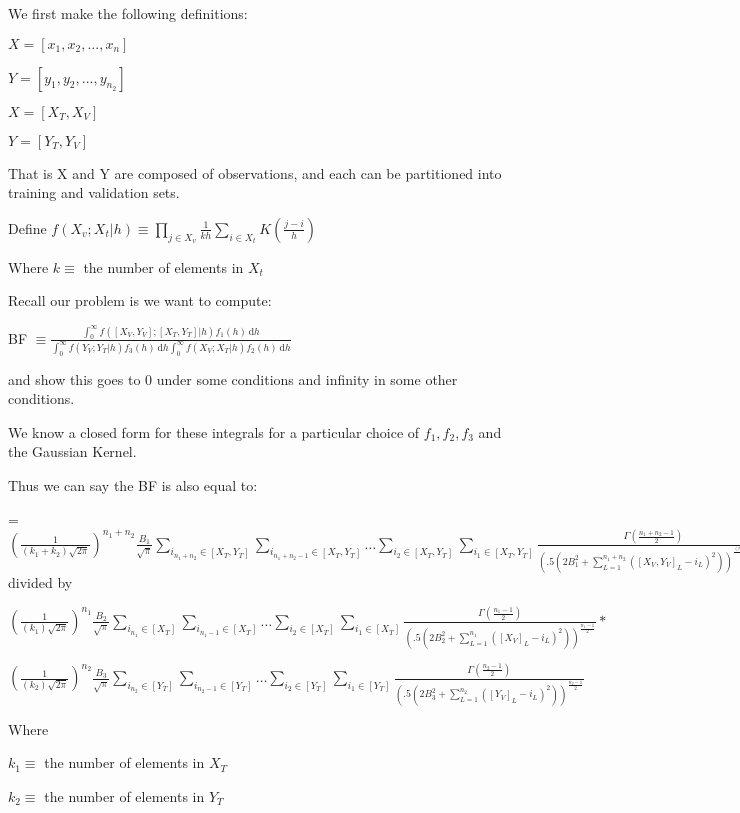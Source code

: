 \documentclass[11pt]{article}
\begin{document}
We first make the following definitions:

$X = [x_1,x_2,...,x_n]$

$Y = [y_1,y_2,...,y_{n_2}]$

$X = [X_T,X_V]$

$Y = [Y_T,Y_V]$

That is X and Y are composed of observations, and each can be partitioned into training and validation sets.

Define $f(X_v; X_t |h) \equiv \prod_{j \in X_v} \frac{1}{kh} \sum_{i \in X_t} K(\frac{j-i}{h})$

Where $k \equiv $ the number of elements in $X_t$

Recall our problem is we want to compute:

BF  $\equiv \frac{\int_0^\infty \! f([X_V,Y_V];[ X_T,Y_T] |h) f_1(h)\, \mathrm{d}h}{\int_0^\infty \! f(Y_V; Y_T|h) f_3(h)\, \mathrm{d}h \int_0^\infty \! f(X_V; X_T|h) f_2(h)\, \mathrm{d}h}$

and show this goes to 0 under some conditions and infinity in some other conditions.

We know a closed form for these integrals for a particular choice of $f_1, f_2, f_3$ and the Gaussian Kernel.

Thus we can say the BF is also equal to:

= $(\frac{1}{(k_1 + k_2)\sqrt{2\pi}})^{n_1+n_2} \frac{B_1}{\sqrt{\pi}}  \sum_{i_{n_1+n_2} \in [X_T, Y_T]} \sum_{i_{n_1+n_2-1}\in [X_T, Y_T]} \ldots  \sum_{i_{2}\in [X_T, Y_T]} \sum_{i_{1}\in [X_T, Y_T]} \frac{ \Gamma (\frac{n_1 + n_2 -1}{2})}{(.5(2B_1^2 +  \sum_{L=1}^{n_1+n_2} ([X_V, Y_V]_{L} - i_L)^2))^{\frac{(n_1+n_2)-1}{2}}} $ divided by

$(\frac{1}{(k_1)\sqrt{2\pi}})^{n_1} \frac{B_2}{\sqrt{\pi}}  \sum_{i_{n_1} \in [X_T]} \sum_{i_{n_1-1}\in [X_T]} \ldots  \sum_{i_{2}\in [X_T]} \sum_{i_{1}\in [X_T]} \frac{ \Gamma (\frac{n_1-1}{2})}{(.5(2B_2^2 +  \sum_{L=1}^{{n_1}} ([X_V]_{L} - i_L)^2))^{\frac{{n_1}-1}{2}}}  * $


$ (\frac{1}{(k_2)\sqrt{2\pi}})^{n_2} \frac{B_3}{\sqrt{\pi}}  \sum_{i_{n_2} \in [Y_T]} \sum_{i_{n_2-1}\in [Y_T]} \ldots  \sum_{i_{2}\in [Y_T]} \sum_{i_{1}\in [Y_T]} \frac{ \Gamma (\frac{n_2-1}{2})}{(.5(2B_3^2 +  \sum_{L=1}^{n_2} ([Y_V]_{L} - i_L)^2))^{\frac{n_2-1}{2}}} $

Where 

$k_1 \equiv $ the number of elements in $X_T$

$k_2 \equiv $ the number of elements in $Y_T$
\end{document}
